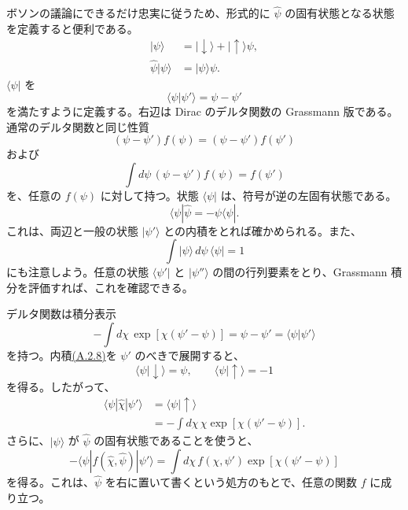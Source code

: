 ボソンの議論にできるだけ忠実に従うため、形式的に $\hat\psi$ の固有状態となる状態を定義すると便利である。
\begin{align}
|\psi\rangle&=|\downarrow\rangle+|\uparrow\rangle\psi,
\tag{A.2.7a}\label{eq:A.2.7a}\\
\hat\psi|\psi\rangle&=|\psi\rangle\psi.
\tag{A.2.7b}\label{eq:A.2.7b}
\end{align}
$\langle\psi|$ を
\begin{equation}
\langle\psi|\psi'\rangle=\psi-\psi'
\tag{A.2.8}\label{eq:A.2.8}
\end{equation}
を満たすように定義する。右辺は Dirac のデルタ関数の Grassmann 版である。通常のデルタ関数と同じ性質
\begin{equation}
(\psi-\psi')f(\psi)=(\psi-\psi')f(\psi')
\tag{A.2.9}\label{eq:A.2.9}
\end{equation}
および
\begin{equation}
\int d\psi\,(\psi-\psi')f(\psi)=f(\psi')
\tag{A.2.10}\label{eq:A.2.10}
\end{equation}
を、任意の $f(\psi)$ に対して持つ。状態 $\langle\psi|$ は、符号が逆の左固有状態である。
\begin{equation}
\langle\psi|\hat\psi=-\psi\langle\psi|.
\tag{A.2.11}\label{eq:A.2.11}
\end{equation}
これは、両辺と一般の状態 $\lvert\psi'\rangle$ との内積をとれば確かめられる。また、
\begin{equation}
\int|\psi\rangle\,d\psi\,\langle\psi|=1
\tag{A.2.12}\label{eq:A.2.12}
\end{equation}
にも注意しよう。任意の状態 $\langle\psi'|$ と $\lvert\psi''\rangle$ の間の行列要素をとり、Grassmann 積分を評価すれば、これを確認できる。

デルタ関数は積分表示
\begin{equation}
-\int d\chi\,\exp[\chi(\psi'-\psi)]
=\psi-\psi'=\langle\psi|\psi'\rangle
\tag{A.2.13}\label{eq:A.2.13}
\end{equation}
を持つ。内積\hyperref[eq:A.2.8]{(A.2.8)}を $\psi'$ のべきで展開すると、
\begin{equation}
\langle\psi|\downarrow\rangle=\psi,\qquad
\langle\psi|\uparrow\rangle=-1
\tag{A.2.14}\label{eq:A.2.14}
\end{equation}
を得る。したがって、
\begin{equation}
\begin{aligned}
\langle\psi|\hat\chi|\psi'\rangle
&=\langle\psi|\uparrow\rangle\\
&=-\int d\chi\,\chi\exp[\chi(\psi'-\psi)].
\end{aligned}
\tag{A.2.15}\label{eq:A.2.15}
\end{equation}
さらに、$\lvert\psi\rangle$ が $\hat\psi$ の固有状態であることを使うと、
\begin{equation}
-\langle\psi|f(\hat\chi,\hat\psi)|\psi'\rangle
=\int d\chi\,f(\chi,\psi')\exp[\chi(\psi'-\psi)]
\tag{A.2.16}\label{eq:A.2.16}
\end{equation}
を得る。これは、$\hat\psi$ を右に置いて書くという処方のもとで、任意の関数 $f$ に成り立つ。


